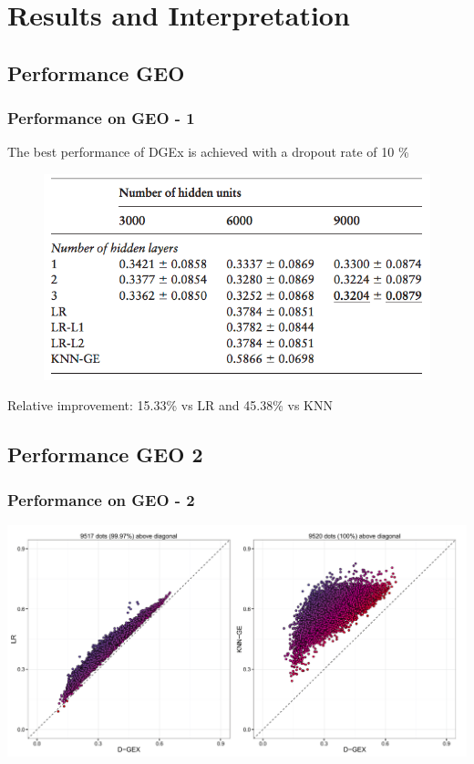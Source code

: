 \documentclass[professionalfont]{beamer}
\begin{document}
  \section{Results and Interpretation}

    \subsection{Performance GEO}
    \begin{frame}
    	\frametitle{Performance on GEO - 1}
    	The best performance of DGEx is achieved with a dropout rate of 10 \%\newline
      \begin{figure}
        \includegraphics[scale=0.7]{figures/res-geo.png}
      \end{figure}
      Relative improvement: 15.33\% vs LR and 45.38\% vs KNN
    \end{frame}

    \subsection{Performance GEO 2}
    \begin{frame}
      \frametitle{Performance on GEO - 2}
      \includegraphics[scale=0.47]{figures/res-geo2.png}
    \end{frame}
\end{document}
